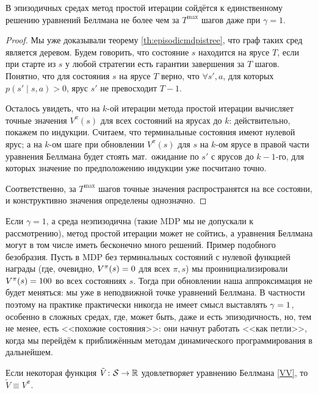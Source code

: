\begin{theoremBox}[label=th:policyevalepisodic]{}
В эпизодичных средах метод простой итерации сойдётся к единственному решению уравнений Беллмана не более чем за $T^{\max}$ шагов даже при $\gamma = 1$.
\begin{proof}
Мы уже доказывали теорему \ref{th:episodicmdpistree}, что граф таких сред является деревом. Будем говорить, что состояние $s$ находится на ярусе $T$, если при старте из $s$ у любой стратегии есть гарантии завершения за $T$ шагов. Понятно, что для состояния $s$ на ярусе $T$ верно, что $\forall s', a$, для которых $p(s' \mid s, a) > 0$, ярус $s'$ не превосходит $T - 1$. 

Осталось увидеть, что на $k$-ой итерации метода простой итерации вычисляет точные значения $V^{\pi}(s)$ для всех состояний на ярусах до $k$: действительно, покажем по индукции. Считаем, что терминальные состояния имеют нулевой ярус; а на $k$-ом шаге при обновлении $V^{\pi}(s)$ для $s$ на $k$-ом ярусе в правой части уравнения Беллмана будет стоять мат.~ожидание по $s'$ с ярусов до $k - 1$-го, для которых значение по предположению индукции уже посчитано точно.

Соответственно, за $T^{\max}$ шагов точные значения распространятся на все состояни, и конструктивно значения определены однозначно.
\end{proof}
\end{theoremBox}

\begin{remark}
Если $\gamma = 1$, а среда неэпизодична (такие MDP мы не допускали к рассмотрению), метод простой итерации может не сойтись, а уравнения Беллмана могут в том числе иметь бесконечно много решений. Пример подобного безобразия. Пусть в MDP без терминальных состояний с нулевой функцией награды (где, очевидно, $V^{\pi}(s) \HM= 0$ для всех $\pi, s$) мы проинициализировали $V^{\pi}(s) \HM= 100$ во всех состояниях $s$. Тогда при обновлении наша аппроксимация не будет меняться: мы уже в неподвижной точке уравнений Беллмана. В частности поэтому на практике практически никогда не имеет смысл выставлять $\gamma \HM = 1$, особенно в сложных средах, где, может быть, даже и есть эпизодичность, но, тем не менее, есть <<похожие состояния>>: они начнут работать <<как петли>>, когда мы перейдём к приближённым методам динамического программирования в дальнейшем.
\end{remark}

\begin{proposition}
Если некоторая функция $\tilde{V} \colon \mathcal{S} \to \mathbb{R}$ удовлетворяет уравнению Беллмана \eqref{VV}, то $\tilde{V} \equiv V^\pi$.
\end{proposition}

